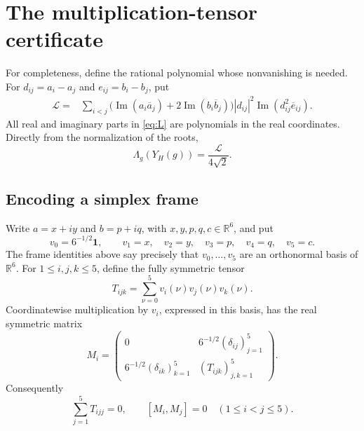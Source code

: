 \documentclass[11pt,reqno]{amsart}
\theoremstyle{remark}
\newcommand{\R}{\mathbb R}
\newcommand{\one}{\mathbf 1}
\newcommand{\abs}[1]{\left\lvert #1\right\rvert}
\begin{document}
\section{The multiplication-tensor certificate}

For completeness, define the rational polynomial whose nonvanishing is needed.
For $d_{ij}=a_i-a_j$ and $e_{ij}=b_i-b_j$, put
\begin{align}
 \mathcal L={}&\sum_{i<j}
 \bigl(\operatorname{Im}(a_i\overline a_j)
      +2\operatorname{Im}(b_i\overline b_j)\bigr)
 \abs{d_{ij}}^2
 \operatorname{Im}(d_{ij}^2\overline e_{ij}).
 \label{eq:L}
\end{align}
All real and imaginary parts in \eqref{eq:L} are polynomials in the real
coordinates.  Directly from the normalization of the roots,
\begin{equation}\label{eq:Lscale}
 \Lambda_g(Y_H(g))=\frac{\mathcal L}{4\sqrt2}.
\end{equation}

\subsection{Encoding a simplex frame}

Write $a=x+iy$ and $b=p+iq$, with $x,y,p,q,c\in\R^6$, and put
\[
 v_0=6^{-1/2}\one,\qquad v_1=x,\quad v_2=y,\quad
 v_3=p,\quad v_4=q,\quad v_5=c.
\]
The frame identities above say precisely that $v_0,\ldots,v_5$ are an
orthonormal basis of $\R^6$.  For $1\le i,j,k\le5$, define the fully symmetric
tensor
\begin{equation}\label{eq:tensor}
 T_{ijk}=\sum_{\nu=0}^5v_i(\nu)v_j(\nu)v_k(\nu).
\end{equation}
Coordinatewise multiplication by $v_i$, expressed in this basis, has the real
symmetric matrix
\begin{equation}\label{eq:Mi}
 M_i=
 \begin{pmatrix}
  0&6^{-1/2}(\delta_{ij})_{j=1}^5\\
  6^{-1/2}(\delta_{ik})_{k=1}^5&(T_{ijk})_{j,k=1}^5
 \end{pmatrix}.
\end{equation}
Consequently
\begin{equation}\label{eq:trace-commute}
 \sum_{j=1}^5T_{ijj}=0,
 \qquad [M_i,M_j]=0\quad(1\le i<j\le5).
\end{equation}
\end{document}
